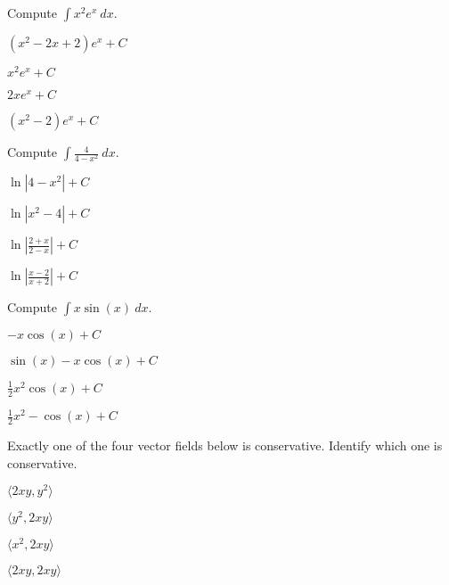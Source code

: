 \begin{readinessAssuranceTest}
\vfill
\item Compute \(\int x^2e^x\ dx\).
\begin{multicols}{4}
\begin{readinessAssuranceTestChoices}
\item \((x^2-2x+2)e^x+C\) %
\item \(x^2e^x+C\)
\item \( 2xe^{x}+C\)
\item \( (x^2-2)e^x+C\)
\end{readinessAssuranceTestChoices}
\end{multicols}

\vfill
\newpage
\item
Compute \(\int \frac{4}{4-x^2}\ dx\).
\begin{multicols}{4}
\begin{readinessAssuranceTestChoices}
\item \( \ln |4-x^2|+C\) 
\item \( \ln |x^2-4|+C\)
\item \( \ln \left|\frac{2+x}{2-x}\right|+C\) %
\item \( \ln \left|\frac{x-2}{x+2}\right|+C\)
\end{readinessAssuranceTestChoices}
\end{multicols}


\vfill
\item
Compute \( \int x\sin(x)\ dx \).
\begin{multicols}{4}
\begin{readinessAssuranceTestChoices}
\item \(-x\cos(x)+C\)
\item \( \sin(x)-x\cos(x)+C \) %
\item \(\frac{1}{2}x^2 \cos(x)+C \)
\item \( \frac{1}{2}x^2-\cos(x)+C\)
\end{readinessAssuranceTestChoices}
\end{multicols}

\vfill

\item Exactly one of the four vector fields below is conservative.  Identify which one is conservative.
\begin{multicols}{4}
\begin{readinessAssuranceTestChoices}
\item \(\langle 2xy,y^2\rangle\)
\item \(\langle y^2,2xy\rangle\) %
\item \(\langle x^2,2xy\rangle\)
\item \(\langle 2xy,2xy\rangle\)
\end{readinessAssuranceTestChoices}
\end{multicols}


\end{readinessAssuranceTest}
